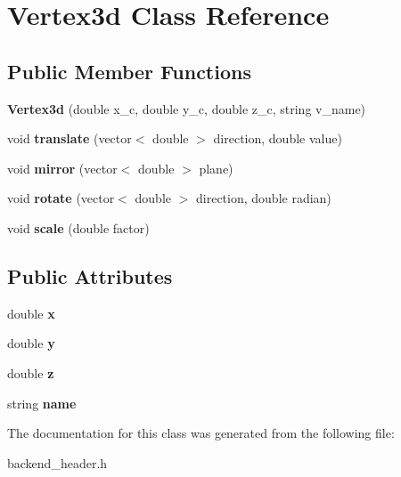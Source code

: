 \hypertarget{classVertex3d}{}\section{Vertex3d Class Reference}
\label{classVertex3d}
\subsection*{Public Member Functions}
\begin{DoxyCompactItemize}
\item 
{\bfseries Vertex3d} (double x\+\_\+c, double y\+\_\+c, double z\+\_\+c, string v\+\_\+name)\hypertarget{classVertex3d_af4c2e68653d7bb7be8a13338b945cf5a}{}\label{classVertex3d_af4c2e68653d7bb7be8a13338b945cf5a}

\item 
void {\bfseries translate} (vector$<$ double $>$ direction, double value)\hypertarget{classVertex3d_a02c96ac26360d2c5487b9ba39aa77b8a}{}\label{classVertex3d_a02c96ac26360d2c5487b9ba39aa77b8a}

\item 
void {\bfseries mirror} (vector$<$ double $>$ plane)\hypertarget{classVertex3d_ae8c2f6ec0f7cc8cfa06f9a68fdd16ea7}{}\label{classVertex3d_ae8c2f6ec0f7cc8cfa06f9a68fdd16ea7}

\item 
void {\bfseries rotate} (vector$<$ double $>$ direction, double radian)\hypertarget{classVertex3d_a94fe74882a867b7e351f8987c45067ec}{}\label{classVertex3d_a94fe74882a867b7e351f8987c45067ec}

\item 
void {\bfseries scale} (double factor)\hypertarget{classVertex3d_a738e2da6c4bfd98fe54ee74bd1fd5aa8}{}\label{classVertex3d_a738e2da6c4bfd98fe54ee74bd1fd5aa8}

\end{DoxyCompactItemize}
\subsection*{Public Attributes}
\begin{DoxyCompactItemize}
\item 
double {\bfseries x}\hypertarget{classVertex3d_a8d69a825ee40fb798112c628e2fa9c2e}{}\label{classVertex3d_a8d69a825ee40fb798112c628e2fa9c2e}

\item 
double {\bfseries y}\hypertarget{classVertex3d_add6b00e5f38b16722a787832ee192d93}{}\label{classVertex3d_add6b00e5f38b16722a787832ee192d93}

\item 
double {\bfseries z}\hypertarget{classVertex3d_a821f3203e5eb07b7e52d9586cc0701db}{}\label{classVertex3d_a821f3203e5eb07b7e52d9586cc0701db}

\item 
string {\bfseries name}\hypertarget{classVertex3d_a6a6cbf9198577d5a180409705bf1e2e1}{}\label{classVertex3d_a6a6cbf9198577d5a180409705bf1e2e1}

\end{DoxyCompactItemize}


The documentation for this class was generated from the following file\+:\begin{DoxyCompactItemize}
\item 
backend\+\_\+header.\+h\end{DoxyCompactItemize}
